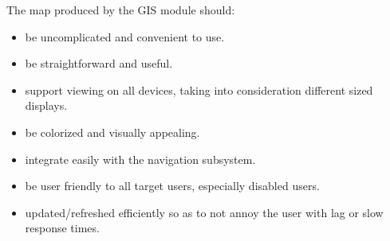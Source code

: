 The map produced by the GIS module should:
\begin{itemize}
\item be uncomplicated and convenient to use.

\item be straightforward and useful.

\item support viewing on all devices, taking into consideration different sized displays.

\item be colorized and visually appealing.

\item integrate easily with the navigation subsystem.

\item be user friendly to all target users, especially disabled users.

\item updated/refreshed efficiently so as to not annoy the user with lag or slow response times.
\end{itemize}
